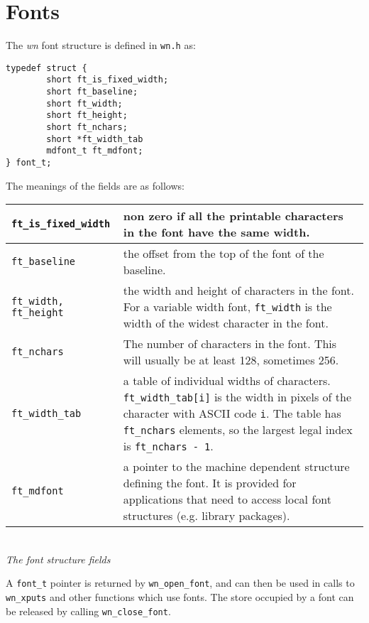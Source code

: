 \section{Fonts}
\label{fonts}
The {\em wn} font structure is defined in {\tt wn.h} as:
\begin{verbatim}
typedef struct {
        short ft_is_fixed_width;
        short ft_baseline;
        short ft_width;
        short ft_height;
        short ft_nchars;
        short *ft_width_tab
        mdfont_t ft_mdfont;
} font_t;
\end{verbatim}
The meanings of the fields are as follows:

\begin{center}
\begin{tabular}{|l|p{4in}|}
\hline
{\tt ft\_is\_fixed\_width} &
non zero if all the printable characters in the font have the same width. \\ \hline
{\tt ft\_baseline} &
the offset from the top of the font of the baseline. \\ \hline
{\tt ft\_width, ft\_height} &
the width and height of characters in the font.
For a variable width font, {\tt ft\_width} is the width of the widest
character in the font. \\ \hline
{\tt ft\_nchars} &
The number of characters in the font.
This will usually be at least 128, sometimes 256. \\ \hline
{\tt ft\_width\_tab} &
a table of individual widths of characters.
{\tt ft\_width\_tab{[i]}} is the width in pixels of the character with
ASCII code {\tt i}.
The table has {\tt ft\_nchars} elements, so the largest legal index is
{\tt ft\_nchars - 1}. \\ \hline
{\tt ft\_mdfont} &
a pointer to the machine dependent structure defining the font.
It is provided for applications that need to access local font structures
(e.g. library packages). \\ \hline
\end{tabular}\\[0.1in]
\nopagebreak
{\em The font structure fields}
\end{center}

A {\tt font\_t} pointer is returned by {\tt wn\_open\_font}, and can then be
used in calls to {\tt wn\_xputs} and other functions which use fonts.
The store occupied by a font can be released by calling {\tt wn\_close\_font}.

